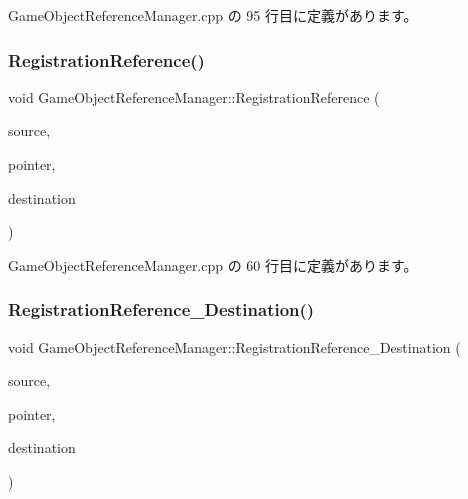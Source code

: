  Game\+Object\+Reference\+Manager.\+cpp の 95 行目に定義があります。

\mbox{\label{class_game_object_reference_manager_a4195eafdda534044454b6d48efc7d03d}} 
\subsubsection{\texorpdfstring{Registration\+Reference()}{RegistrationReference()}}
{\footnotesize\ttfamily void Game\+Object\+Reference\+Manager\+::\+Registration\+Reference (\begin{DoxyParamCaption}\item[{\mbox{\hyperlink{class_game_object_base}{Game\+Object\+Base}} $\ast$}]{source,  }\item[{void $\ast$}]{pointer,  }\item[{\mbox{\hyperlink{class_game_object_base}{Game\+Object\+Base}} $\ast$}]{destination }\end{DoxyParamCaption})}



 Game\+Object\+Reference\+Manager.\+cpp の 60 行目に定義があります。

\mbox{\label{class_game_object_reference_manager_a8aaa23d4a8644a100b7154c92b845f78}} 
\subsubsection{\texorpdfstring{Registration\+Reference\+\_\+\+Destination()}{RegistrationReference\_Destination()}}
{\footnotesize\ttfamily void Game\+Object\+Reference\+Manager\+::\+Registration\+Reference\+\_\+\+Destination (\begin{DoxyParamCaption}\item[{\mbox{\hyperlink{class_game_object_base}{Game\+Object\+Base}} $\ast$}]{source,  }\item[{void $\ast$}]{pointer,  }\item[{\mbox{\hyperlink{class_game_object_base}{Game\+Object\+Base}} $\ast$}]{destination }\end{DoxyParamCaption})\hspace{0.3cm}{\ttfamily [private]}}



